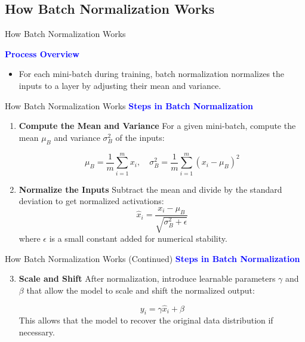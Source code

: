 \documentclass[serif, aspectratio=169]{beamer}
\begin{document}
\subsection{How Batch Normalization Works}

\begin{frame}{How Batch Normalization Works}

    \textcolor{blue}{\textbf{Process Overview}}
    
    \begin{itemize}

        \item  For each mini-batch during training, batch normalization normalizes the inputs to a layer by adjusting their mean and variance.

    \end{itemize}
\end{frame}

\begin{frame}{How Batch Normalization Works}
\textcolor{blue}{\textbf{Steps in Batch Normalization}}
\begin{enumerate}
    \item \textbf{Compute the Mean and Variance} 
          \newline
          For a given mini-batch, compute the mean $\mu_B$ and variance $\sigma_B^2$ of the inputs:

          \[
           \mu_B = \frac{1}{m} \sum_{i=1}^{m} x_i, \quad \sigma_B^2 = \frac{1}{m} \sum_{i=1}^{m} (x_i - \mu_B)^2
          \]
    \item \textbf{Normalize the Inputs}
    \newline
    Subtract the mean and divide by the standard deviation to get normalized activations:
    \[
    \hat{x}_i = \frac{x_i - \mu_B}{\sqrt{\sigma_B^2 + \epsilon}}
    \]
    where $\epsilon$ is a small constant added for numerical stability.
\end{enumerate}
\end{frame}

\begin{frame}{How Batch Normalization Works (Continued)}
\textcolor{blue}{\textbf{Steps in Batch Normalization}}
\begin{enumerate}
    \setcounter{enumi}{2} %
    \item \textbf{Scale and Shift}
    \newline
    After normalization, introduce learnable parameters $\gamma$ and $\beta$ that allow the model to scale and shift the normalized output:

    \[
        y_i = \gamma \hat{x}_i + \beta
    \]
    This allows that the model to recover the original data distribution if necessary.
\end{enumerate}
\end{frame}
\end{document}
